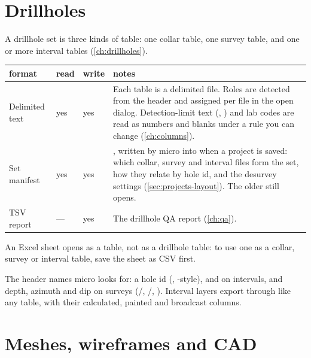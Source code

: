 \section{Drillholes}\label{sec:formats-drillholes}

A drillhole set is three kinds of table: one collar table, one survey table, and one or more
interval tables (\cref{ch:drillholes}).

\begin{tabularx}{\linewidth}{@{}p{27mm}p{9mm}p{9mm}L@{}}
\toprule
format & read & write & notes \\
\midrule
Delimited text & yes & yes & Each table is a delimited file. Roles are detected from the header and
  assigned per file in the open dialog. Detection-limit text (, ) and lab codes
  are read as numbers and blanks under a rule you can change (\cref{ch:columns}). \\
Set manifest & yes & yes & , written by micro into  when
  a project is saved: which collar, survey and interval files form the set, how they relate by hole
  id, and the desurvey settings (\cref{sec:projects-layout}). The older 
  still opens. \\
TSV report & — & yes & The drillhole QA report (\cref{ch:qa}). \\
\bottomrule
\end{tabularx}

An Excel sheet opens as a table, not as a drillhole table: to use one as a collar, survey or
interval table, save the sheet as CSV first.

The header names micro looks for: a hole id (, -style),  and
 on intervals, and depth, azimuth and dip on surveys (/,
/, ). Interval layers export through  like any table,
with their calculated, painted and broadcast columns.

\section{Meshes, wireframes and CAD}\label{sec:formats-meshes}

